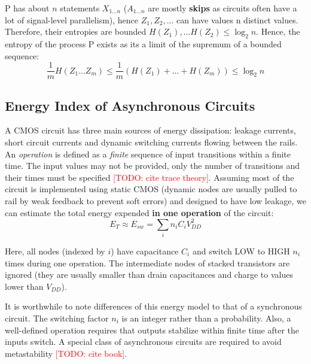 P has about $n$ statements $X_{1...n}$ ($A_{1...n}$
are mostly \textbf{skips} as circuits often have a lot of signal-level
parallelism), hence $Z_1, Z_2, ...$ can have values n distinct values. 
Therefore, their entropies are bounded $H(Z_1), ... H(Z_2) \le \log_2{n}$.
Hence, the entropy of the process P exists as its a limit of the supremum
of a bounded sequence:
\begin{equation}
	\frac{1}{m} H(Z_1...Z_m) \le \frac{1}{m} (H(Z_1) + ... + H(Z_m)) \le
	\log_2{n}
\end{equation}

\subsection{Energy Index of Asynchronous Circuits}

A CMOS circuit has three main sources of energy dissipation: leakage currents,
short circuit currents and dynamic switching currents flowing between the rails.
An \emph{operation} is defined as a \emph{finite} sequence of input transitions
within a finite time. The input values may not be provided, only the number of
transitions and their times must be specified 
\textcolor{red}{[TODO: cite trace theory]}.
Assuming most of the circuit is implemented using static CMOS (dynamic nodes
are usually pulled to rail by weak feedback to prevent soft errors) and 
designed to have low leakage, we can estimate the total energy expended
\textbf{in one operation} of the circuit:
\begin{equation}
	E_T \approx E_{sw} = \sum_{i} n_i C_i V_{DD}^2 
\end{equation}

Here, all nodes (indexed by $i$) have capacitance $C_i$ and switch
 LOW to HIGH $n_i$ times during one operation.
The intermediate nodes of stacked transistors are ignored (they are usually smaller than drain
capacitances and charge to values lower than $V_{DD}$).

It is worthwhile to note differences of this energy model to that of a
synchronous circuit. The switching factor $n_i$ is an integer rather than a probability. 
Also, a well-defined operation requires that outputs stabilize within
finite time after the inputs switch. A special class of asynchronous circuits 
are required to avoid metastability \textcolor{red}{[TODO:
cite book]}.
\\

